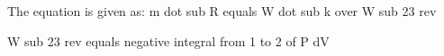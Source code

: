 The equation is given as:
m dot sub R equals W dot sub k over W sub 23 rev

W sub 23 rev equals negative integral from 1 to 2 of P dV